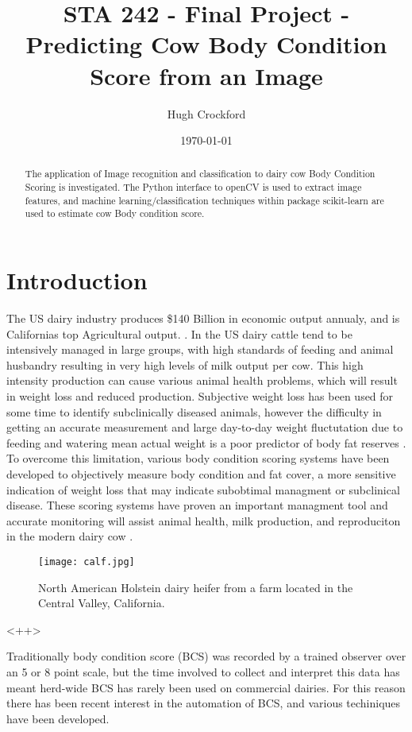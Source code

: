 \documentclass[11pt]{article}
\title{STA 242 - Final Project - Predicting Cow Body Condition Score from an Image}
\author{Hugh Crockford}
\date{\today}
\begin{document}
	\maketitle
	\tableofcontents

	\begin{abstract}
		The application of Image recognition and classification to dairy cow Body Condition Scoring is investigated.
		The Python interface to openCV is used to extract image features, and machine learning/classification techniques within package scikit-learn are used to estimate cow Body condition score.
	\end{abstract}

\newpage
\section{Introduction}
		The US dairy industry produces \$140 Billion in economic output annualy, and is Californias top Agricultural output. \cite{cmab13}. 
		In the US dairy cattle tend to be intensively managed in large groups, with high standards of feeding and animal husbandry resulting in very high levels of milk output per cow.
		This high intensity production can cause various animal health problems, which will result in weight loss and reduced production.
		Subjective weight loss has been used for some time to identify subclinically diseased animals, however the difficulty in getting an accurate measurement and large day-to-day weight fluctutation due to feeding and watering mean actual weight is a poor predictor of body fat reserves\cite{Roche2004} .
		To overcome this limitation, various body condition scoring systems have been developed to objectively measure body condition and fat cover, a more sensitive indication of weight loss that may indicate subobtimal managment or subclinical disease\cite{Wildman1982}.
		These scoring systems have proven an important managment tool and accurate monitoring will assist animal health, milk production, and reproduciton in the modern dairy cow \cite{Buckley2003}.


		\begin{figure}[b!]
			\centering
			\texttt{[image: calf.jpg]}
			\caption{North American Holstein dairy heifer from a farm located in the Central Valley, California.}
			\label{fig:<+label+>}
		\end{figure}<++>

		Traditionally body condition score (BCS) was recorded by a trained observer over an 5 or 8 point scale\cite{Bewley2010}, but the time involved to collect and interpret this data has meant herd-wide BCS has rarely been used on commercial dairies.
		For this reason there has been recent interest in the automation of BCS, and various techiniques have been developed.
\end{document}
